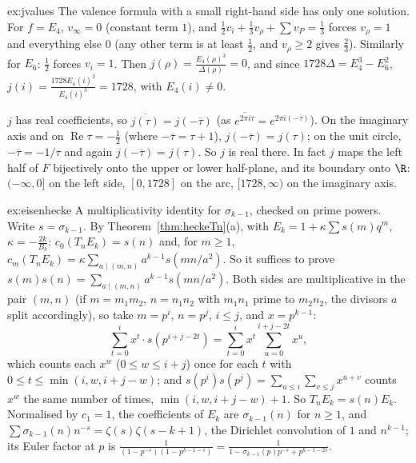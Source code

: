 \begin{solution}{ex:jvalues}
\idea The valence formula with a small right-hand side has only one solution.
\writeup For $f=E_4$, $v_\infty=0$ (constant term $1$), and $\frac12v_i+\frac13v_\rho+\sum v_P=\frac13$ forces $v_\rho=1$ and everything else $0$ (any other term is at least
$\frac12$, and $v_\rho\ge2$ gives $\frac23$). Similarly for $E_6$: $\frac12$ forces $v_i=1$. Then $j(\rho)=\frac{E_4(\rho)^3}{\Delta(\rho)}=0$, and since
$1728\Delta=E_4^3-E_6^2$, $j(i)=\frac{1728E_4(i)^3}{E_4(i)^3}=1728$, with $E_4(i)\ne0$.

$j$ has real coefficients, so $\overline{j(\tau)}=j(-\overline\tau)$ (as $\overline{e^{2\pi i\tau}}=e^{2\pi i(-\overline\tau)}$). On the imaginary axis and on
$\operatorname{Re}\tau=-\frac12$ (where $-\overline\tau=\tau+1$), $j(-\overline\tau)=j(\tau)$; on the unit circle, $-\overline\tau=-1/\tau$ and again $j(-\overline\tau)=j(\tau)$. So $j$ is real
there. In fact $j$ maps the left half of $F$ bijectively onto the upper or lower half-plane, and its boundary onto $\R$: $(-\infty,0]$ on the left side, $[0,1728]$ on the
arc, $[1728,\infty)$ on the imaginary axis.
\end{solution}

\begin{solution}{ex:eisenhecke}
\idea A multiplicativity identity for $\sigma_{k-1}$, checked on prime powers.
\writeup Write $s=\sigma_{k-1}$. By Theorem~\ref{thm:heckeTn}(a), with $E_k=1+\kappa\sum s(m)q^m$, $\kappa=-\frac{2k}{B_k}$: $c_0(T_nE_k)=s(n)$ and, for $m\ge1$,
$c_m(T_nE_k)=\kappa\sum_{a\mid(m,n)}a^{k-1}s(mn/a^2)$. So it suffices to prove $s(m)s(n)=\sum_{a\mid(m,n)}a^{k-1}s(mn/a^2)$. Both sides are multiplicative in the pair
$(m,n)$ (if $m=m_1m_2$, $n=n_1n_2$ with $m_1n_1$ prime to $m_2n_2$, the divisors $a$ split accordingly), so take $m=p^i$, $n=p^j$, $i\le j$, and $x=p^{k-1}$:
\[
\sum_{t=0}^ix^t\cdot s(p^{i+j-2t})=\sum_{t=0}^ix^t\sum_{u=0}^{i+j-2t}x^u ,
\]
which counts each $x^w$ ($0\le w\le i+j$) once for each $t$ with $0\le t\le\min(i,w,i+j-w)$; and $s(p^i)s(p^j)=\sum_{u\le i}\sum_{v\le j}x^{u+v}$ counts $x^w$ the same number of
times, $\min(i,w,i+j-w)+1$. So $T_nE_k=s(n)E_k$. Normalised by $c_1=1$, the coefficients of $E_k$ are $\sigma_{k-1}(n)$ for $n\ge1$, and
$\sum\sigma_{k-1}(n)n^{-s}=\zeta(s)\zeta(s-k+1)$, the Dirichlet convolution of $1$ and $n^{k-1}$; its Euler factor at $p$ is
$\frac1{(1-p^{-s})(1-p^{k-1-s})}=\frac1{1-\sigma_{k-1}(p)p^{-s}+p^{k-1-2s}}$.
\end{solution}

